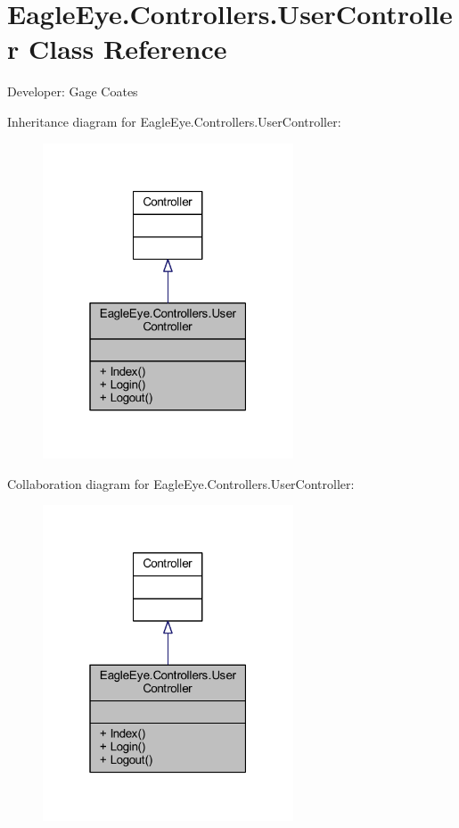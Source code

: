 \hypertarget{class_eagle_eye_1_1_controllers_1_1_user_controller}{}\section{Eagle\+Eye.\+Controllers.\+User\+Controller Class Reference}
\label{class_eagle_eye_1_1_controllers_1_1_user_controller}


Developer\+: Gage Coates  




Inheritance diagram for Eagle\+Eye.\+Controllers.\+User\+Controller\+:
\nopagebreak
\begin{figure}[H]
\begin{center}
\leavevmode
\includegraphics[width=211pt]{class_eagle_eye_1_1_controllers_1_1_user_controller__inherit__graph}
\end{center}
\end{figure}


Collaboration diagram for Eagle\+Eye.\+Controllers.\+User\+Controller\+:
\nopagebreak
\begin{figure}[H]
\begin{center}
\leavevmode
\includegraphics[width=211pt]{class_eagle_eye_1_1_controllers_1_1_user_controller__coll__graph}
\end{center}
\end{figure}
